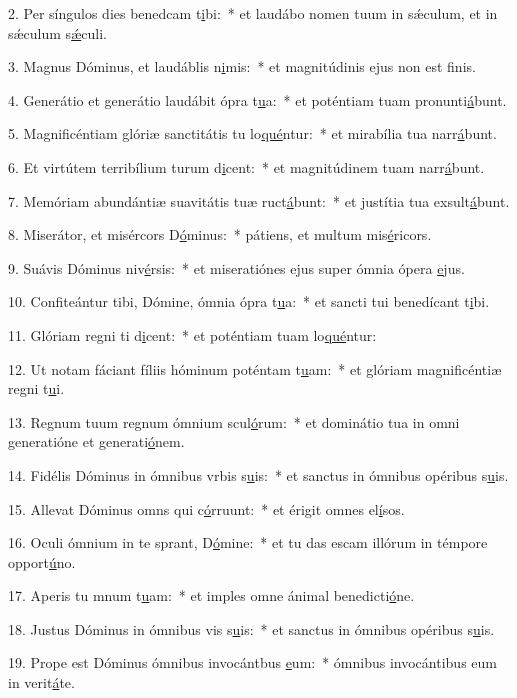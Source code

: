 2. Per síngulos dies benedcam t\uline{i}bi:~* et laudábo nomen tuum in sǽculum, et in sǽculum s\uline{ǽ}culi.\par 
3. Magnus Dóminus, et laudáblis n\uline{i}mis:~* et magnitúdinis ejus non est f\uline{i}nis.\par 
4. Generátio et generátio laudábit ópra t\uline{u}a:~* et poténtiam tuam pronunti\uline{á}bunt.\par 
5. Magnificéntiam glóriæ sanctitátis tu lo\uline{qué}ntur:~* et mirabília tua narr\uline{á}bunt.\par 
6. Et virtútem terribílium turum d\uline{i}cent:~* et magnitúdinem tuam narr\uline{á}bunt.\par 
7. Memóriam abundántiæ suavitátis tuæ ruct\uline{á}bunt:~* et justítia tua exsult\uline{á}bunt.\par 
8. Miserátor, et misércors D\uline{ó}minus:~* pátiens, et multum mis\uline{é}ricors.\par 
9. Suávis Dóminus niv\uline{é}rsis:~* et miseratiónes ejus super ómnia ópera \uline{e}jus.\par 
10. Confiteántur tibi, Dómine, ómnia ópra t\uline{u}a:~* et sancti tui benedícant t\uline{i}bi.\par 
11. Glóriam regni ti d\uline{i}cent:~* et poténtiam tuam lo\uline{qué}ntur:\par 
12. Ut notam fáciant fíliis hóminum poténtam t\uline{u}am:~* et glóriam magnificéntiæ regni t\uline{u}i.\par 
13. Regnum tuum regnum ómnium scul\uline{ó}rum:~* et dominátio tua in omni generatióne et generati\uline{ó}nem.\par 
14. Fidélis Dóminus in ómnibus vrbis s\uline{u}is:~* et sanctus in ómnibus opéribus s\uline{u}is.\par 
15. Allevat Dóminus omns qui c\uline{ó}rruunt:~* et érigit omnes el\uline{í}sos.\par 
16. Oculi ómnium in te sprant, D\uline{ó}mine:~* et tu das escam illórum in témpore opport\uline{ú}no.\par 
17. Aperis tu mnum t\uline{u}am:~* et imples omne ánimal benedicti\uline{ó}ne.\par 
18. Justus Dóminus in ómnibus vis s\uline{u}is:~* et sanctus in ómnibus opéribus s\uline{u}is.\par 
19. Prope est Dóminus ómnibus invocántbus \uline{e}um:~* ómnibus invocántibus eum in verit\uline{á}te.\par 
